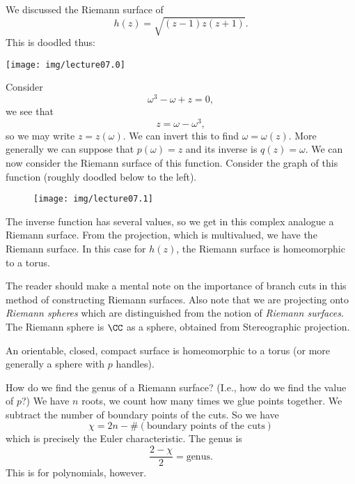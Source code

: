 We discussed the Riemann surface of
\begin{equation}
h(z)=\sqrt{(z-1)z(z+1)}.
\end{equation}
This is doodled thus:
\begin{center}
\texttt{[image: img/lecture07.0]}
\end{center}
Consider
\begin{equation}
\omega^{3}-\omega+z=0,
\end{equation}
we see that
\begin{equation}
z=\omega-\omega^{3},
\end{equation}
so we may write $z=z(\omega)$. We can invert this to find
$\omega=\omega(z)$. More generally we can suppose that
$p(\omega)=z$ and its inverse is $q(z)=\omega$. We can now
consider the Riemann surface of this function. Consider the graph
of this function (roughly doodled below to the left).

\begin{wrapfigure}{l}{3in}
\begin{center}
\texttt{[image: img/lecture07.1]}
\end{center}
\end{wrapfigure}
\noindent{}The inverse function has several values, so we get in this
complex analogue a Riemann surface. From the projection, which is
multivalued, we have the Riemann surface. In this case for
$h(z)$, the Riemann surface is homeomorphic to a torus.

The reader should make a mental note on the importance of branch
cuts in this method of constructing Riemann surfaces. Also note
that we are projecting onto \emph{Riemann spheres} which are
distinguished from the notion of \emph{Riemann surfaces}. The
Riemann sphere is $\CC$ as a sphere, obtained from Stereographic
projection. 

\begin{prop}
An orientable, closed, compact surface is homeomorphic to a torus
(or more generally a sphere with $p$ handles).
\end{prop}

How do we find the genus of a Riemann surface? (I.e., how do we
find the value of $p$?) We have $n$ roots, we count how many
times we glue points together. We subtract the number of boundary
points of the cuts. So we have
\begin{equation}
\chi=2n-\#(\mbox{boundary points of the cuts})
\end{equation}
which is precisely the Euler characteristic. The genus is
\begin{equation}
\frac{2-\chi}{2}=\mbox{genus}.
\end{equation}
This is for polynomials, however.

